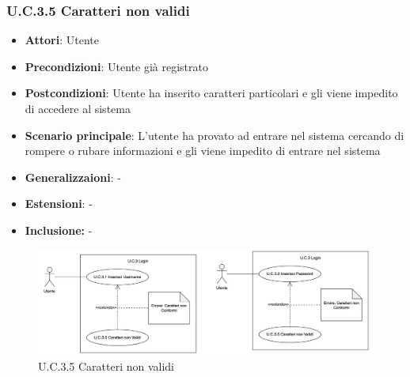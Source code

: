 \subsubsection{U.C.3.5 Caratteri non validi}
\begin{itemize}
    \item \textbf{Attori}: Utente
    \item \textbf{Precondizioni}: Utente già registrato
    \item \textbf{Postcondizioni}: Utente ha inserito caratteri particolari e gli viene impedito di accedere al sistema
    \item \textbf{Scenario principale}: L’utente ha provato ad entrare nel sistema cercando di rompere o rubare informazioni e gli viene impedito di entrare nel sistema
    \item \textbf{Generalizzaioni}: -
    \item \textbf{Estensioni}: -
    \item \textbf{Inclusione:} -
\end{itemize}
\begin{figure}[h!]
    \centering
    \includegraphics[width=\textwidth]{img/UC3-5.png}
    \caption{U.C.3.5 Caratteri non validi}
\end{figure}